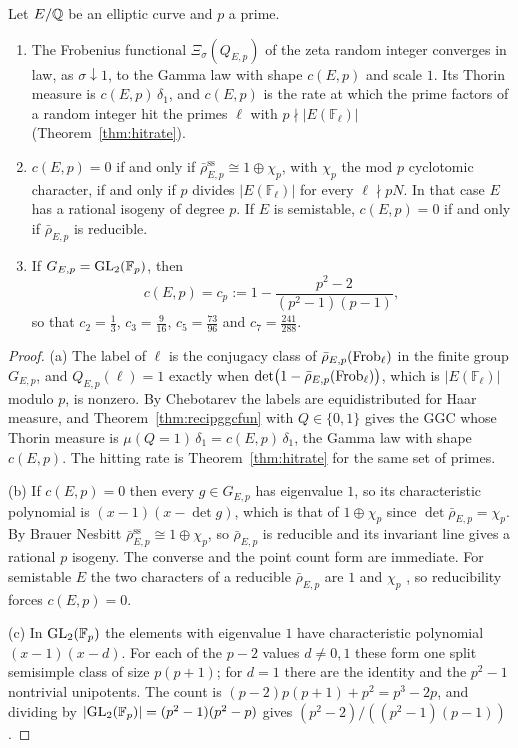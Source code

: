 \begin{proposition}\label{prop:flteisgamma}
Let $E/\mathbb{Q}$ be an elliptic curve and $p$ a prime.
\begin{enumerate}
\item[(a)] The Frobenius functional $\Xi_\sigma(Q_{E,p})$ of the zeta random integer converges in law, as $\sigma\downarrow1$, to the Gamma law with shape $c(E,p)$ and scale $1$. Its Thorin measure is $c(E,p)\,\delta_1$, and $c(E,p)$ is the rate at which the prime factors of a random integer hit the primes $\ell$ with $p\nmid|E(\mathbb F_\ell)|$ (Theorem~\ref{thm:hitrate}).
\item[(b)] $c(E,p)=0$ if and only if $\bar\rho_{E,p}^{\mathrm{ss}}\cong1\oplus\chi_p$, with $\chi_p$ the mod $p$ cyclotomic character, if and only if $p$ divides $|E(\mathbb F_\ell)|$ for every $\ell\nmid pN$. In that case $E$ has a rational isogeny of degree $p$. If $E$ is semistable, $c(E,p)=0$ if and only if $\bar\rho_{E,p}$ is reducible.
\item[(c)] If $G_{E,p}=\mathrm{GL}_2(\mathbb F_p)$, then
\[
c(E,p)=c_p:=1-\frac{p^2-2}{(p^2-1)(p-1)},
\]
so that $c_2=\frac13$, $c_3=\frac9{16}$, $c_5=\frac{73}{96}$ and $c_7=\frac{241}{288}$.
\end{enumerate}
\end{proposition}

\begin{proof}
(a) The label of $\ell$ is the conjugacy class of $\bar\rho_{E,p}(\operatorname{Frob}_\ell)$ in the finite group $G_{E,p}$, and $Q_{E,p}(\ell)=1$ exactly when $\det\bigl(1-\bar\rho_{E,p}(\operatorname{Frob}_\ell)\bigr)$, which is $|E(\mathbb F_\ell)|$ modulo $p$, is nonzero. By Chebotarev the labels are equidistributed for Haar measure, and Theorem~\ref{thm:recipggcfun} with $Q\in\{0,1\}$ gives the GGC whose Thorin measure is $\mu(Q=1)\,\delta_1=c(E,p)\,\delta_1$, the Gamma law with shape $c(E,p)$. The hitting rate is Theorem~\ref{thm:hitrate} for the same set of primes.

(b) If $c(E,p)=0$ then every $g\in G_{E,p}$ has eigenvalue $1$, so its characteristic polynomial is $(x-1)(x-\det g)$, which is that of $1\oplus\chi_p$ since $\det\bar\rho_{E,p}=\chi_p$. By Brauer Nesbitt $\bar\rho_{E,p}^{\mathrm{ss}}\cong1\oplus\chi_p$, so $\bar\rho_{E,p}$ is reducible and its invariant line gives a rational $p$ isogeny. The converse and the point count form are immediate. For semistable $E$ the two characters of a reducible $\bar\rho_{E,p}$ are $1$ and $\chi_p$ \cite{serre1972}, so reducibility forces $c(E,p)=0$.

(c) In $\mathrm{GL}_2(\mathbb F_p)$ the elements with eigenvalue $1$ have characteristic polynomial $(x-1)(x-d)$. For each of the $p-2$ values $d\ne0,1$ these form one split semisimple class of size $p(p+1)$; for $d=1$ there are the identity and the $p^2-1$ nontrivial unipotents. The count is $(p-2)p(p+1)+p^2=p^3-2p$, and dividing by $|\mathrm{GL}_2(\mathbb F_p)|=(p^2-1)(p^2-p)$ gives $(p^2-2)/((p^2-1)(p-1))$.
\end{proof}

